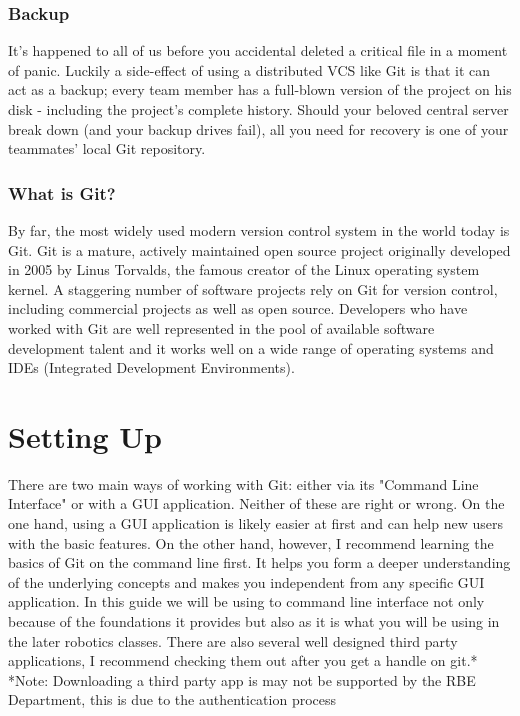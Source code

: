 \documentclass{article}
\begin{document}
    \subsubsection{Backup}
    It's happened to all of us before you accidental deleted a critical file in a moment of panic. Luckily a side-effect of using a distributed VCS like Git is that it can act as a backup; every team member has a full-blown version of the project on his disk - including the project's complete history. Should your beloved central server break down (and your backup drives fail), all you need for recovery is one of your teammates' local Git repository.
    
    \subsubsection{What is Git?}
    By far, the most widely used modern version control system in the world today is Git. Git is a mature, actively maintained open source project originally developed in 2005 by Linus Torvalds, the famous creator of the Linux operating system kernel. A staggering number of software projects rely on Git for version control, including commercial projects as well as open source. Developers who have worked with Git are well represented in the pool of available software development talent and it works well on a wide range of operating systems and IDEs (Integrated Development Environments).
    
\section{Setting Up}
There are two main ways of working with Git: either via its "Command Line Interface" or with a GUI application. Neither of these are right or wrong.
\newline\newline
On the one hand, using a GUI application is likely easier at first and can help new users with the basic features.
\newline\newline
On the other hand, however, I recommend learning the basics of Git on the command line first. It helps you form a deeper understanding of the underlying concepts and makes you independent from any specific GUI application.
\newline\newline
In this guide we will be using to command line interface not only because of the foundations it provides but also as it is what you will be using in the later robotics classes.
\newline\newline
There are also several well designed third party applications, I recommend checking them out after you get a handle on git.*
\newline\newline
*Note: Downloading a third party app is may not be supported by the RBE Department, this is due to the authentication process 
\end{document}
